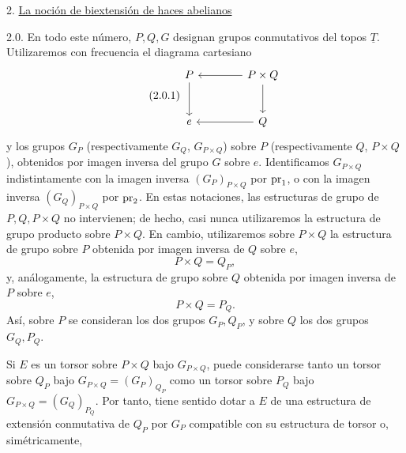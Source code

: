 
2. \underline{La noción de biextensión de haces abelianos}

2.0. En todo este número, $P,Q,G$ designan grupos conmutativos del
topos $\underline T$. Utilizaremos con frecuencia el diagrama
cartesiano
\begin{equation}\tag{2.0.1}
\begin{tikzcd}[column sep=4em,row sep=2.6em]
 P \arrow[d] & P\times Q \arrow[l] \arrow[d] \\
 e & Q \arrow[l]
\end{tikzcd}
\end{equation}
y los grupos $G_P$ (respectivamente $G_Q$, $G_{P\times Q}$) sobre $P$
(respectivamente $Q$, $P\times Q$), obtenidos por imagen inversa del
grupo $G$ sobre $e$. Identificamos $G_{P\times Q}$ indistintamente con
la imagen inversa $(G_P)_{P\times Q}$ por $\operatorname{pr}_1$, o con la imagen
inversa $(G_Q)_{P\times Q}$ por $\operatorname{pr}_2$. En estas notaciones, las
estructuras de grupo de $P,Q,P\times Q$ no intervienen; de hecho, casi
nunca utilizaremos la estructura de grupo producto sobre $P\times Q$.
En cambio, utilizaremos sobre $P\times Q$ la estructura de grupo sobre
$P$ obtenida por imagen inversa de $Q$ sobre $e$,
\begin{equation}\tag{2.0.2}
 P\times Q=Q_P,
\end{equation}
y, análogamente, la estructura de grupo sobre $Q$ obtenida por imagen
inversa de $P$ sobre $e$,
\begin{equation}\tag{2.0.3}
 P\times Q=P_Q.
\end{equation}
Así, sobre $P$ se consideran los dos grupos $G_P,Q_P$, y sobre $Q$ los
dos grupos $G_Q,P_Q$.

Si $E$ es un torsor sobre $P\times Q$ bajo $G_{P\times Q}$, puede
considerarse tanto un torsor sobre $Q_P$ bajo
$G_{P\times Q}=(G_P)_{Q_P}$ como un torsor sobre $P_Q$ bajo
$G_{P\times Q}=(G_Q)_{P_Q}$. Por tanto, tiene sentido dotar a $E$ de
una estructura de extensión conmutativa de $Q_P$ por $G_P$ compatible
con su estructura de torsor o, simétricamente,


